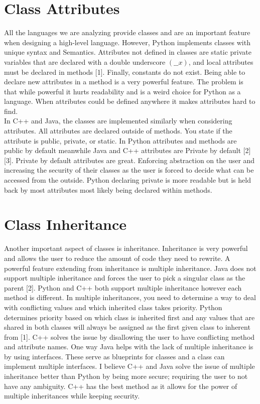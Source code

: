 \documentclass[sigconf, nonacm, authorversion, language=english, 12pt]{acmart}
\def\tab{\hspace*{5mm}}
\begin{document}
\section{Class Attributes}

\tab All the languages we are analyzing provide classes and are an important feature when designing a high-level language. However, Python implements classes with unique
syntax and Semantics. Attributes not defined in classes are static private variables that are declared with a double underscore $(\_\_x)$, and local
attributes must be declared in methods [1]. Finally, constants do not exist. Being able to declare new attributes in a method is a very powerful feature.
The problem is that while powerful it hurts readability and is a weird choice for Python as a language. When attributes could be defined anywhere it makes attributes hard to find.\\

\tab In C++ and Java, the classes are implemented similarly when considering attributes. All attributes are declared outside of methods. You state if the attribute is public, private, or static.
In Python attributes and methods are public by default meanwhile Java and C++ attributes are Private by default [2][3]. Private by default attributes are great. Enforcing abstraction on the user and
increasing the security of their classes as the user is forced to decide what can be accessed from the outside. Python declaring private is more readable but is held back by most attributes
most likely being declared within methods.\\

\section{Class Inheritance}

\tab Another important aspect of classes is inheritance. Inheritance is very powerful and allows the user to reduce the amount of code they need to rewrite. A powerful feature extending from
inheritance is multiple inheritance. Java does not support multiple inheritance and forces the user to pick a singular class as the parent [2]. Python and C++ both support multiple inheritance
however each method is different. In multiple inheritances, you need to determine a way to deal with conflicting values and which inherited class takes priority. Python determines priority based
on which class is inherited first and any values that are shared in both classes will always be assigned as the first given class to inherent from [1]. C++ solves the issue by disallowing the user to have conflicting
method and attribute names. One way Java helps with the lack of multiple inheritance is by using interfaces. These serve as blueprints for classes and a class can implement multiple interfaces.
I believe C++ and Java solve the issue of multiple inheritance better than Python by being more secure; requiring the user to not have any ambiguity. C++ has the best method as it allows for the power of
multiple inheritances while keeping security.\\
\end{document}

